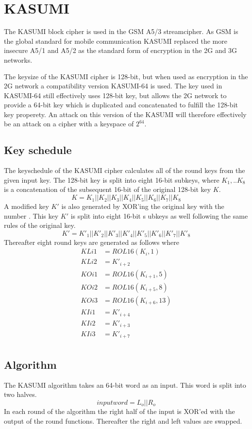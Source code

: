 \chapter{KASUMI}
\label{ch:kas}
The KASUMI block cipher is used in the GSM A5/3 streamcipher. As GSM
is the global standard for mobile communication KASUMI replaced the
more insecure A5/1 and A5/2 as the standard form of encryption in the
2G and 3G networks.

The keysize of the KASUMI cipher is 128-bit, but when used as
encryption in the 2G network a compatibility version KASUMI-64 is
used. The key used in KASUMI-64 still effectively uses 128-bit key,
but allows the 2G network to provide a 64-bit key which is duplicated
and concatenated to fulfill the 128-bit key properety. An attack on
this version of the KASUMI will therefore effectively be an attack on
a cipher with a keyspace of $2^{64}$.
\section{Key schedule}
The keyschedule of the KASUMI cipher calculates all of the round keys
from the given input key. The 128-bit key is split into eight 16-bit
subkeys, where $K_1,..K_8$ is a concatenation of the subsequent 16-bit of
the original 128-bit key $K$.
\[K = K_1 || K_2 || K_3 || K_4 || K_5 || K_6 || K_7 || K_8\]
A modified key $K'$ is also generated by XOR'ing the original key with
the number . This key $K'$ is split
into eight 16-bit s%
ubkeys as well following the same rules of the
original key.
\[K' = K'_1 || K'_2 || K'_3 || K'_4 || K'_5 || K'_6 || K'_7 || K'_8\]
Thereafter eight round keys are generated as follows where 
\begin{align*}
  KLi1 &= ROL16(K_i,1)\\
  KLi2 &= K'_{i+2}\\
  KOi1 &= ROL16(K_{i + 1},5)\\
  KOi2 &= ROL16(K_{i + 5},8)\\
  KOi3 &= ROL16(K_{i + 6},13)\\
  KIi1 &= K'_{i+4}\\
  KIi2 &= K'_{i+3}\\
  KIi3 &= K'_{i+7}\\
\end{align*}
\section{Algorithm}
The KASUMI algorithm takes an 64-bit word as an input. This word is
split into two halves.
\[ inputword = L_o || R_o\]
In each round of the algorithm the right half of the input is XOR'ed
with the output of the round functions. Thereafter the right and left
values are swapped.

